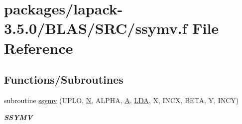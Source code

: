 \hypertarget{lapack-3_85_80_2BLAS_2SRC_2ssymv_8f}{}\section{packages/lapack-\/3.5.0/\+B\+L\+A\+S/\+S\+R\+C/ssymv.f File Reference}
\label{lapack-3_85_80_2BLAS_2SRC_2ssymv_8f}
\subsection*{Functions/\+Subroutines}
\begin{DoxyCompactItemize}
\item 
subroutine \hyperlink{group__single__blas__level2_gabbe9933ddf6f0137156d4f2491f2afdb}{ssymv} (U\+P\+L\+O, \hyperlink{polmisc_8c_a0240ac851181b84ac374872dc5434ee4}{N}, A\+L\+P\+H\+A, \hyperlink{classA}{A}, \hyperlink{example__user_8c_ae946da542ce0db94dced19b2ecefd1aa}{L\+D\+A}, X, I\+N\+C\+X, B\+E\+T\+A, Y, I\+N\+C\+Y)
\begin{DoxyCompactList}\small\item\em {\bfseries S\+S\+Y\+M\+V} \end{DoxyCompactList}\end{DoxyCompactItemize}
